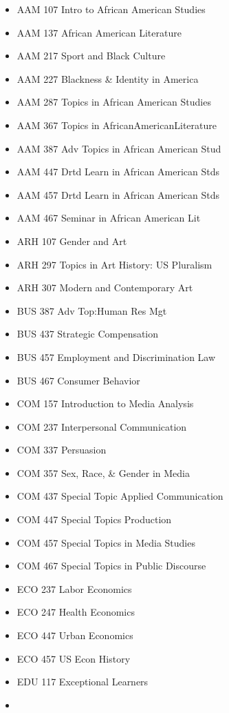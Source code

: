 \documentclass[
  letterpaper,
]{scrbook}
\providecommand{\tightlist}{%
  \setlength{\itemsep}{0pt}\setlength{\parskip}{0pt}}
\begin{document}
\begin{itemize}
\tightlist
\item
  AAM 107 Intro to African American Studies
\item
  AAM 137 African American Literature
\item
  AAM 217 Sport and Black Culture
\item
  AAM 227 Blackness \& Identity in America
\item
  AAM 287 Topics in African American Studies
\item
  AAM 367 Topics in AfricanAmericanLiterature
\item
  AAM 387 Adv Topics in African American Stud
\item
  AAM 447 Drtd Learn in African American Stds
\item
  AAM 457 Drtd Learn in African American Stds
\item
  AAM 467 Seminar in African American Lit
\item
  ARH 107 Gender and Art
\item
  ARH 297 Topics in Art History: US Pluralism
\item
  ARH 307 Modern and Contemporary Art
\item
  BUS 387 Adv Top:Human Res Mgt
\item
  BUS 437 Strategic Compensation
\item
  BUS 457 Employment and Discrimination Law
\item
  BUS 467 Consumer Behavior
\item
  COM 157 Introduction to Media Analysis
\item
  COM 237 Interpersonal Communication
\item
  COM 337 Persuasion
\item
  COM 357 Sex, Race, \& Gender in Media
\item
  COM 437 Special Topic Applied Communication
\item
  COM 447 Special Topics Production
\item
  COM 457 Special Topics in Media Studies
\item
  COM 467 Special Topics in Public Discourse
\item
  ECO 237 Labor Economics
\item
  ECO 247 Health Economics
\item
  ECO 447 Urban Economics
\item
  ECO 457 US Econ History
\item
  EDU 117 Exceptional Learners
\item

\end{itemize}
\end{document}
